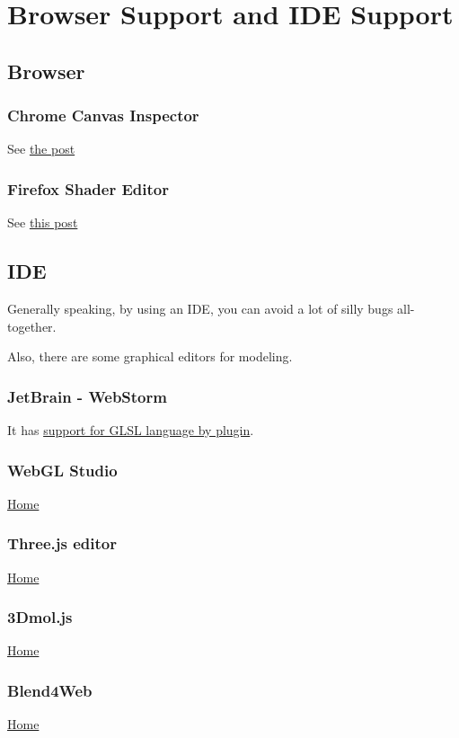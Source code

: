 \section{Browser Support and IDE
Support}\label{browser-support-and-ide-support}

\subsection{Browser}\label{browser}

\subsubsection{Chrome Canvas Inspector}\label{chrome-canvas-inspector}

See
\href{http://learningthreejs.com/blog/2013/04/05/debugging-with-chromes-canvas-inspection/}{the
post}

\subsubsection{Firefox Shader Editor}\label{firefox-shader-editor}

See
\href{https://hacks.mozilla.org/2013/11/live-editing-webgl-shaders-with-firefox-developer-tools/}{this
post}

\subsection{IDE}\label{ide}

Generally speaking, by using an IDE, you can avoid a lot of silly bugs
all-together.

Also, there are some graphical editors for modeling.

\subsubsection{JetBrain - WebStorm}\label{jetbrain---webstorm}

It has \href{https://plugins.jetbrains.com/plugin/6993?pr=idea}{support
for GLSL language by plugin}.

\subsubsection{WebGL Studio}\label{webgl-studio}

\href{http://webglstudio.org}{Home}

\subsubsection{Three.js editor}\label{three.js-editor}

\href{http://threejs.org/editor/}{Home}

\subsubsection{3Dmol.js}\label{dmol.js}

\href{http://3dmol.csb.pitt.edu}{Home}

\subsubsection{Blend4Web}\label{blend4web}

\href{https://www.blend4web.com/en/}{Home}
